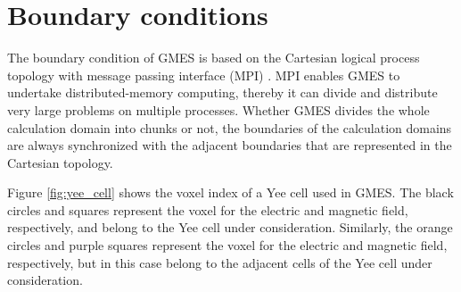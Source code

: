 \section{Boundary conditions}
\label{sec:boundary}
The boundary condition of GMES is based on the Cartesian logical process topology with message passing interface (MPI) \cite{message_passing_interface_forum_mpi:_2009}. MPI enables GMES to undertake distributed-memory computing, thereby it can divide and distribute very large problems on multiple processes. Whether GMES divides the whole calculation domain into chunks or not, the boundaries of the calculation domains are always synchronized with the adjacent boundaries that are represented in the Cartesian topology. 

Figure \ref{fig:yee_cell} shows the voxel index of a Yee cell used in GMES. The black circles and squares represent the voxel for the electric and magnetic field, respectively, and belong to the Yee cell under consideration. Similarly, the orange circles and purple squares represent the voxel for the electric and magnetic field, respectively, but in this case belong to the adjacent cells of the Yee cell under consideration. 


